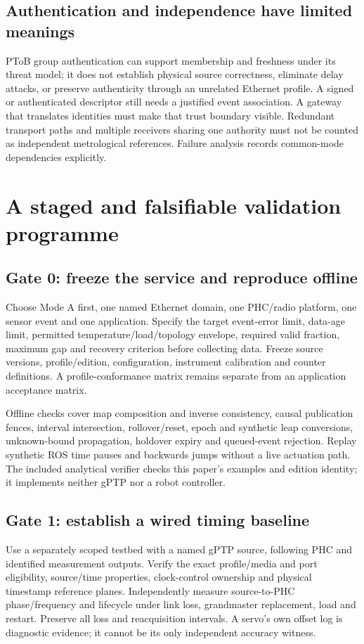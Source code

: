 \documentclass[11pt,letterpaper]{article}
\begin{document}
\subsection{Authentication and independence have limited meanings}
PToB group authentication can support membership and freshness under its threat model; it does not establish physical source correctness, eliminate delay attacks, or preserve authenticity through an unrelated Ethernet profile. A signed or authenticated descriptor still needs a justified event association. A gateway that translates identities must make that trust boundary visible. Redundant transport paths and multiple receivers sharing one authority must not be counted as independent metrological references. Failure analysis records common-mode dependencies explicitly.

\section{A staged and falsifiable validation programme}\label{sec:validation}
\subsection{Gate 0: freeze the service and reproduce offline}
Choose Mode A first, one named Ethernet domain, one PHC/radio platform, one sensor event and one application. Specify the target event-error limit, data-age limit, permitted temperature/load/topology envelope, required valid fraction, maximum gap and recovery criterion before collecting data. Freeze source versions, profile/edition, configuration, instrument calibration and counter definitions. A profile-conformance matrix remains separate from an application acceptance matrix.

Offline checks cover map composition and inverse consistency, causal publication fences, interval intersection, rollover/reset, epoch and synthetic leap conversions, unknown-bound propagation, holdover expiry and queued-event rejection. Replay synthetic ROS time pauses and backwards jumps without a live actuation path. The included analytical verifier checks this paper's examples and edition identity; it implements neither gPTP nor a robot controller.

\subsection{Gate 1: establish a wired timing baseline}
Use a separately scoped testbed with a named gPTP source, following PHC and identified measurement outputs. Verify the exact profile/media and port eligibility, source/time properties, clock-control ownership and physical timestamp reference planes. Independently measure source-to-PHC phase/frequency and lifecycle under link loss, grandmaster replacement, load and restart. Preserve all loss and reacquisition intervals. A servo's own offset log is diagnostic evidence; it cannot be its only independent accuracy witness.
\end{document}
